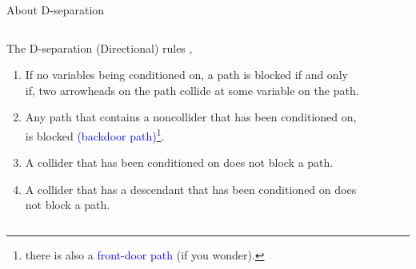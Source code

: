 %
%
\begin{frame}
	{About D-separation}
	\begin{columns}
		\begin{column}{0.5\textwidth}
			The D-separation (Directional) rules \cite{Hernan_2020},
			\begin{enumerate}
				\item If no variables being conditioned on, a path is blocked if and only if, two arrowheads on the path collide at some variable on the path.
				\item Any path that contains a noncollider that has been conditioned on, is blocked \textcolor{blue}{(backdoor path)}\footnote{there is also a \textcolor{blue}{front-door path} (if you wonder).}.
				\item A collider that has been conditioned on does not block a path.
				\item A collider that has a descendant that has been conditioned on does not block a path.
			\end{enumerate}
		\end{column}
		\begin{column}{0.5\textwidth}  
			\begin{figure}
			\end{figure}
			\begin{figure}
			\end{figure}
			\begin{figure}
\end{figure}
\end{column}
\end{columns}
\end{frame}
